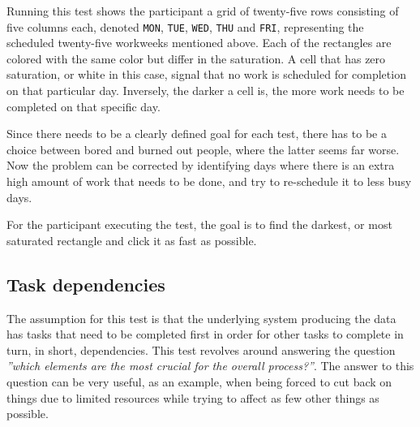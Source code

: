 \documentclass[nofilelist,dvipsnames]{cslthse-msc}
\begin{document}
{        Running this test shows the participant a grid of twenty-five rows
        consisting of five columns each, denoted
        \texttt{MON},
        \texttt{TUE},
        \texttt{WED},
        \texttt{THU} and
        \texttt{FRI},
        representing the scheduled twenty-five workweeks mentioned above. Each
        of the rectangles are colored with the same color but differ in the
        saturation. A cell that has zero saturation, or white in this case,
        signal that no work is scheduled for completion on that particular day.
        Inversely, the darker a cell is, the more work needs to be completed on
        that specific day.

        Since there needs to be a clearly defined goal for each test, there has
        to be a choice between bored and burned out people, where the latter
        seems far worse. Now the problem can be corrected by identifying days
        where there is an extra high amount of work that needs to be done, and
        try to re-schedule it to less busy days.

        For the participant executing the test, the goal is to find the
        darkest, or most saturated rectangle and click it as fast as possible.

      \subsection{Task dependencies}

        \textit{\ideaThree}

        The assumption for this test is that the underlying system producing
        the data has tasks that need to be completed first in order for other
        tasks to complete in turn, in short, dependencies. This test revolves
        around answering the question
        \textit{''which elements are the most crucial for the overall
          process?''}. The answer to this question can be very useful, as an
        example, when being forced to cut back on things due to limited
        resources while trying to affect as few other things as possible.

}
\end{document}
